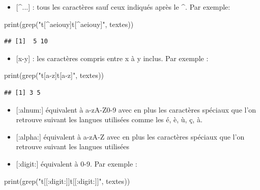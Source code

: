 \documentclass[
]{book}
\newenvironment{Shaded}{\begin{snugshade}}{\end{snugshade}}
\newcommand{\FunctionTok}[1]{\textcolor[rgb]{0.00,0.00,0.00}{#1}}
\newcommand{\NormalTok}[1]{#1}
\newcommand{\StringTok}[1]{\textcolor[rgb]{0.31,0.60,0.02}{#1}}
\providecommand{\tightlist}{%
  \setlength{\itemsep}{0pt}\setlength{\parskip}{0pt}}
\theoremstyle{definition}
\theoremstyle{definition}
\theoremstyle{definition}
\theoremstyle{definition}
\theoremstyle{remark}
\begin{document}
\begin{itemize}
\tightlist
\item
  {[}\^{}...{]} : tous les caractères sauf ceux indiqués après le \^{}. Par exemple:
\end{itemize}

\begin{Shaded}
\begin{Highlighting}[]
\FunctionTok{print}\NormalTok{(}\FunctionTok{grep}\NormalTok{(}\StringTok{"t[\^{}aeiouy]t[\^{}aeiouy]"}\NormalTok{, textes))}
\end{Highlighting}
\end{Shaded}

\begin{verbatim}
## [1]  5 10
\end{verbatim}

\begin{itemize}
\tightlist
\item
  {[}x-y{]} : les caractères compris entre x à y inclus. Par exemple :
\end{itemize}

\begin{Shaded}
\begin{Highlighting}[]
\FunctionTok{print}\NormalTok{(}\FunctionTok{grep}\NormalTok{(}\StringTok{"t[a{-}z]t[a{-}z]"}\NormalTok{, textes))}
\end{Highlighting}
\end{Shaded}

\begin{verbatim}
## [1] 3 5
\end{verbatim}

\begin{itemize}
\item
  {[}:alnum:{]} équivalent à a-zA-Z0-9 avec en plus les caractères spéciaux que l'on retrouve suivant les langues utilisées comme les é, è, ù, ç, à.
\item
  {[}:alpha:{]} équivalent à a-zA-Z avec en plus les caractères spéciaux que l'on retrouve suivant les langues utilisées
\item
  {[}:digit:{]} équivalent à 0-9. Par exemple :
\end{itemize}

\begin{Shaded}
\begin{Highlighting}[]
\FunctionTok{print}\NormalTok{(}\FunctionTok{grep}\NormalTok{(}\StringTok{"t[[:digit:]]t[[:digit:]]"}\NormalTok{, textes))}
\end{Highlighting}
\end{Shaded}
\end{document}
